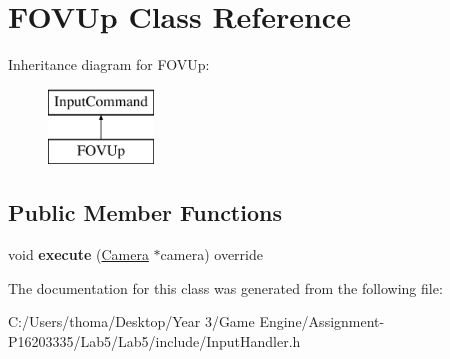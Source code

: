 \hypertarget{class_f_o_v_up}{}\section{F\+O\+V\+Up Class Reference}
\label{class_f_o_v_up}
Inheritance diagram for F\+O\+V\+Up\+:\begin{figure}[H]
\begin{center}
\leavevmode
\includegraphics[height=2.000000cm]{class_f_o_v_up}
\end{center}
\end{figure}
\subsection*{Public Member Functions}
\begin{DoxyCompactItemize}
\item 
\mbox{\label{class_f_o_v_up_ac2ff3101947579eba4c90e50f871e441}} 
void {\bfseries execute} (\mbox{\hyperlink{class_camera}{Camera}} $\ast$camera) override
\end{DoxyCompactItemize}


The documentation for this class was generated from the following file\+:\begin{DoxyCompactItemize}
\item 
C\+:/\+Users/thoma/\+Desktop/\+Year 3/\+Game Engine/\+Assignment-\/\+P16203335/\+Lab5/\+Lab5/include/Input\+Handler.\+h\end{DoxyCompactItemize}
